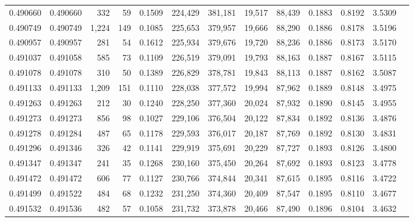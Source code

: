 \begin{tabular}{rrrrrrrrrrrrr}
0.490660 & 0.490660 &   332 &    59 &                                     0.1509 & 224,429 & 381,181 &  19,517 &  88,439 & 0.1883 & 0.8192 & 3.5309 \\
0.490749 & 0.490749 & 1,224 &   149 &                                     0.1085 & 225,653 & 379,957 &  19,666 &  88,290 & 0.1886 & 0.8178 & 3.5196 \\
0.490957 & 0.490957 &   281 &    54 &                                     0.1612 & 225,934 & 379,676 &  19,720 &  88,236 & 0.1886 & 0.8173 & 3.5170 \\
0.491037 & 0.491058 &   585 &    73 &                                     0.1109 & 226,519 & 379,091 &  19,793 &  88,163 & 0.1887 & 0.8167 & 3.5115 \\
0.491078 & 0.491078 &   310 &    50 &                                     0.1389 & 226,829 & 378,781 &  19,843 &  88,113 & 0.1887 & 0.8162 & 3.5087 \\
0.491133 & 0.491133 & 1,209 &   151 &                                     0.1110 & 228,038 & 377,572 &  19,994 &  87,962 & 0.1889 & 0.8148 & 3.4975 \\
0.491263 & 0.491263 &   212 &    30 &                                     0.1240 & 228,250 & 377,360 &  20,024 &  87,932 & 0.1890 & 0.8145 & 3.4955 \\
0.491273 & 0.491273 &   856 &    98 &                                     0.1027 & 229,106 & 376,504 &  20,122 &  87,834 & 0.1892 & 0.8136 & 3.4876 \\
0.491278 & 0.491284 &   487 &    65 &                                     0.1178 & 229,593 & 376,017 &  20,187 &  87,769 & 0.1892 & 0.8130 & 3.4831 \\
0.491296 & 0.491346 &   326 &    42 &                                     0.1141 & 229,919 & 375,691 &  20,229 &  87,727 & 0.1893 & 0.8126 & 3.4800 \\
0.491347 & 0.491347 &   241 &    35 &                                     0.1268 & 230,160 & 375,450 &  20,264 &  87,692 & 0.1893 & 0.8123 & 3.4778 \\
0.491472 & 0.491472 &   606 &    77 &                                     0.1127 & 230,766 & 374,844 &  20,341 &  87,615 & 0.1895 & 0.8116 & 3.4722 \\
0.491499 & 0.491522 &   484 &    68 &                                     0.1232 & 231,250 & 374,360 &  20,409 &  87,547 & 0.1895 & 0.8110 & 3.4677 \\
0.491532 & 0.491536 &   482 &    57 &                                     0.1058 & 231,732 & 373,878 &  20,466 &  87,490 & 0.1896 & 0.8104 & 3.4632 \\

\end{tabular}
